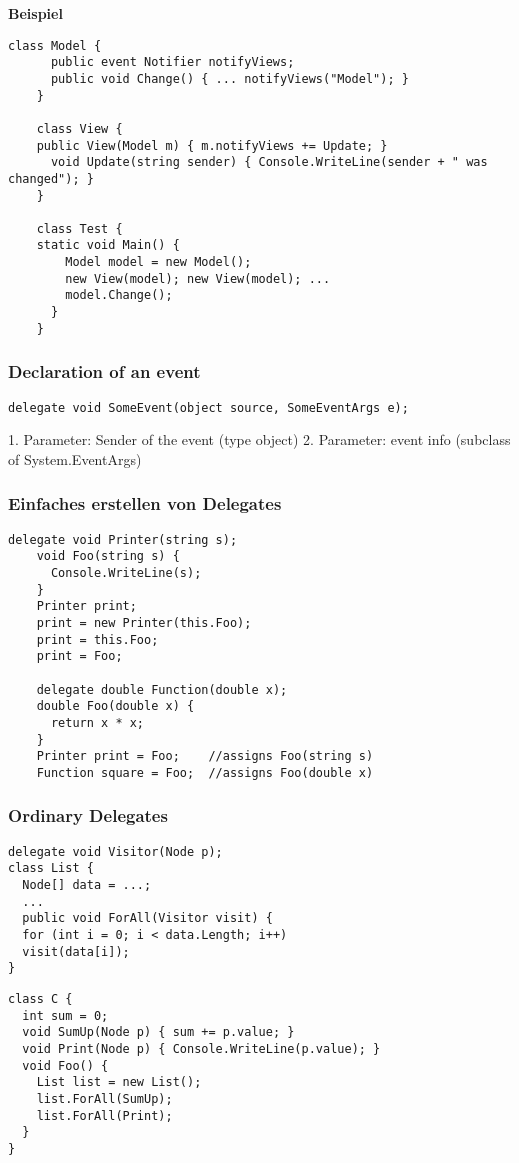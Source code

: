 \textbf{Beispiel}
\begin{lstlisting}[style=Csharp]
	class Model {
	  public event Notifier notifyViews;
	  public void Change() { ... notifyViews("Model"); }
	}
	
	class View {
  	public View(Model m) { m.notifyViews += Update; }
	  void Update(string sender) { Console.WriteLine(sender + " was changed"); }
	}
	
	class Test {
  	static void Main() {
    	Model model = new Model();
	    new View(model); new View(model); ...
	    model.Change();
	  }
	}
\end{lstlisting}

\subsubsection{Declaration of an event}
\begin{lstlisting}
delegate void SomeEvent(object source, SomeEventArgs e);
\end{lstlisting}
1. Parameter: Sender of the event (type object)
2. Parameter: event info (subclass of System.EventArgs)


\subsubsection{Einfaches erstellen von Delegates}
\begin{lstlisting}[style=CSharp]
	delegate void Printer(string s);
	void Foo(string s) {
	  Console.WriteLine(s);
	}
	Printer print;
	print = new Printer(this.Foo);
	print = this.Foo;
	print = Foo;
	
	delegate double Function(double x);
	double Foo(double x) {
	  return x * x;
	}
	Printer print = Foo;    //assigns Foo(string s)
	Function square = Foo;  //assigns Foo(double x)
\end{lstlisting}


\newpage
\subsubsection{Ordinary Delegates}
\begin{multicols}{2}
	
\begin{lstlisting}[style=CSharp]
delegate void Visitor(Node p);
class List {
  Node[] data = ...;
  ...
  public void ForAll(Visitor visit) {
  for (int i = 0; i < data.Length; i++)
  visit(data[i]);
}
\end{lstlisting}

\columnbreak
  
\begin{lstlisting}[style=CSharp]
class C {
  int sum = 0;
  void SumUp(Node p) { sum += p.value; }
  void Print(Node p) { Console.WriteLine(p.value); }
  void Foo() {
    List list = new List();
    list.ForAll(SumUp);
    list.ForAll(Print);
  }
}
  \end{lstlisting}

\end{multicols}

